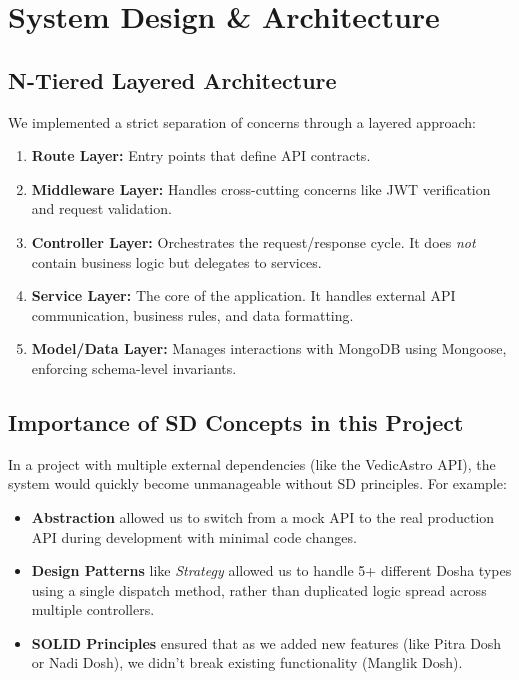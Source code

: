 \documentclass[12pt,a4paper]{article}
\begin{document}
\section{System Design \& Architecture}

\subsection{N-Tiered Layered Architecture}
We implemented a strict separation of concerns through a layered approach:
\begin{enumerate}
    \item \textbf{Route Layer:} Entry points that define API contracts.
    \item \textbf{Middleware Layer:} Handles cross-cutting concerns like JWT verification and request validation.
    \item \textbf{Controller Layer:} Orchestrates the request/response cycle. It does \textit{not} contain business logic but delegates to services.
    \item \textbf{Service Layer:} The core of the application. It handles external API communication, business rules, and data formatting.
    \item \textbf{Model/Data Layer:} Manages interactions with MongoDB using Mongoose, enforcing schema-level invariants.
\end{enumerate}

\subsection{Importance of SD Concepts in this Project}
In a project with multiple external dependencies (like the VedicAstro API), the system would quickly become unmanageable without SD principles. For example:
\begin{itemize}
    \item \textbf{Abstraction} allowed us to switch from a mock API to the real production API during development with minimal code changes.
    \item \textbf{Design Patterns} like \textit{Strategy} allowed us to handle 5+ different Dosha types using a single dispatch method, rather than duplicated logic spread across multiple controllers.
    \item \textbf{SOLID Principles} ensured that as we added new features (like Pitra Dosh or Nadi Dosh), we didn't break existing functionality (Manglik Dosh).
\end{itemize}
\end{document}
